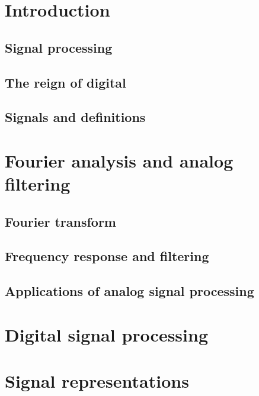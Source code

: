 \documentclass[a4paper, 10pt, dvipsnames]{book}
\begin{document}
\chapter{Introduction}

\section{Signal processing}
\label{sec:}

\lipsum[2-4]

\section{The reign of digital}

\section{Signals and definitions}


\chapter{Fourier analysis and analog filtering}


\label{sec:}
\section{Fourier transform}
\label{sec:}
\section{Frequency response and filtering}
\label{sec:}
\section{Applications of analog signal processing}
\label{sec:}

\chapter{Digital signal processing}

\chapter{Signal representations}
\end{document}
